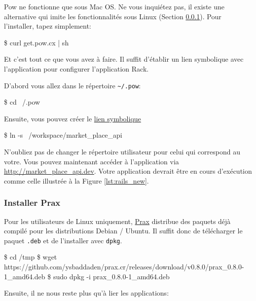 \documentclass[]{report}
\begin{document}
        Pow ne fonctionne que sous Mac OS. Ne vous inquiétez pas, il existe une alternative qui imite les fonctionnalités sous Linux (Section \ref{subsubsect:prax}). Pour l'installer, tapez simplement:

        \begin{bashcode}
        \$ curl get.pow.cx | sh
        \end{bashcode}

        Et c'est tout ce que vous avez à faire. Il suffit d'établir un lien symbolique avec l'application pour configurer l'application Rack.

        D'abord vous allez dans le répertoire \verb|~/.pow|:

        \begin{bashcode}
        \$ cd ~/.pow
        \end{bashcode}

        Ensuite, vous pouvez créer le \href{http://en.wikipedia.org/wiki/Symbolic_link}{lien symbolique}

        \begin{bashcode}
        \$ ln -s ~/workspace/market_place_api
        \end{bashcode}

        N'oubliez pas de changer le répertoire utilisateur pour celui qui correspond au votre. Vous pouvez maintenant accéder à l'application via \href{http://market_place_api.dev/}{http://market\_place\_api.dev}. Votre application devrait être en cours d'exécution comme celle illustrée à la Figure \ref{lst:rails_new}.

      \subsubsection{Installer Prax}\label{subsubsect:prax}

        Pour les utilisateurs de Linux uniquement, \href{https://github.com/ysbaddaden/prax.cr}{Prax} distribue des paquets déjà compilé pour les distributions Debian / Ubuntu. Il suffit donc de télécharger le paquet \verb|.deb| et de l'installer avec \verb|dpkg|.

        \begin{bashcode}
        \$ cd /tmp
        \$ wget https://github.com/ysbaddaden/prax.cr/releases/download/v0.8.0/prax_0.8.0-1_amd64.deb
        \$ sudo dpkg -i prax_0.8.0-1_amd64.deb
        \end{bashcode}

        Ensuite, il ne nous reste plus qu'à lier les applications:
\end{document}
